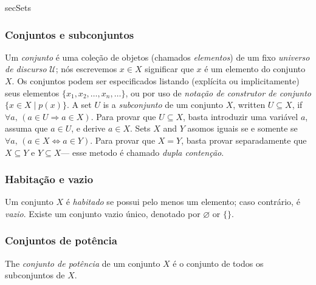 \begin{tldr}{secSets}

\subsubsection*{Conjuntos e subconjuntos}

\begin{tldrlist}
 Um \textit{conjunto} é uma coleção de objetos (chamados \textit{elementos}) de um fixo \textit{universo de discurso} $\mathcal{U}$; nós escrevemos $x \in X$ significar que $x$ é um elemento do conjunto $X$. Os conjuntos podem ser especificados listando (explícita ou implicitamente) seus elementos $\{ x_1, x_2, \dots, x_n, \dots \}$, ou por uso de \textit{notação de construtor de conjunto} $\{ x \in X \mid p(x) \}$.
 A set $U$ is a \textit{subconjunto} de um conjunto $X$, written $U \subseteq X$, if $\forall a,\, (a \in U \Rightarrow a \in X)$. Para provar que $U \subseteq X$, basta introduzir uma variável $a$, assuma que $a \in U$, e derive $a \in X$.
 Sets $X$ and $Y$ asomos iguais se e somente se $\forall a,\, (a \in X \Leftrightarrow a \in Y)$. Para provar que $X = Y$, basta provar separadamente que $X \subseteq Y$ e $Y \subseteq X$--- esse metodo é chamado \textit{dupla contenção}.
\end{tldrlist}

\subsubsection*{Habitação e vazio}

\begin{tldrlist}
 Um conjunto $X$ é \textit{habitado} se possui pelo menos um elemento; caso contrário, é \textit{vazio}.
 Existe um conjunto vazio único, denotado por $\varnothing$ or $\{ \}$.
\end{tldrlist}

\subsubsection*{Conjuntos de potência}
\begin{tldrlist}
 The \textit{conjunto de potência} de um conjunto $X$ é o conjunto de todos os subconjuntos de $X$.
\end{tldrlist}
\end{tldr}
